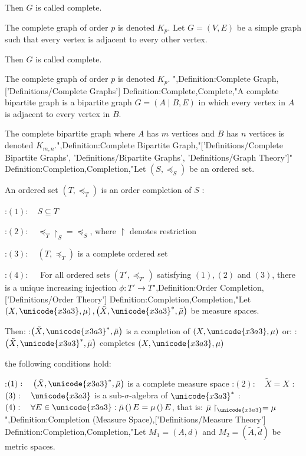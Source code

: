 Then $G$ is called complete.


The complete graph of order $p$ is denoted $K_p$.
Let $G = \left( V, E \right)$ be a simple graph such that every vertex is adjacent to every other vertex.

Then $G$ is called complete.


The complete graph of order $p$ is denoted $K_p$.
",Definition:Complete Graph,['Definitions/Complete Graphs']
Definition:Complete,Complete,"A complete bipartite graph is a bipartite graph $G = \left( A \mid B, E \right)$ in which every vertex in $A$ is adjacent to every vertex in $B$.

The complete bipartite graph where $A$ has $m$ vertices and $B$ has $n$ vertices is denoted $K_{m, n}$.",Definition:Complete Bipartite Graph,"['Definitions/Complete Bipartite Graphs', 'Definitions/Bipartite Graphs', 'Definitions/Graph Theory']"
Definition:Completion,Completion,"Let $\left( S, \preceq_S \right)$ be an ordered set.


An ordered set $\left( T, \preceq_T \right)$ is an order completion of $S$ :

:$(1):\quad S \subseteq T$

:$(2):\quad {\preceq_T \restriction_S} = {\preceq_S}$, where $\restriction$ denotes restriction

:$(3):\quad \left( T, \preceq_T \right)$ is a complete ordered set

:$(4):\quad$ For all ordered sets $\left( T', \preceq_{T'}  \right)$ satisfying $(1), (2)$ and $(3)$, there is a unique increasing injection $\phi: T' \to T$",Definition:Order Completion,['Definitions/Order Theory']
Definition:Completion,Completion,"Let $\left( X, \unicode{x3a3}, \mu \right), \left( \tilde X, \unicode{x3a3}^*, \bar \mu \right)$ be measure spaces.

Then:
:$\left( \tilde X, \unicode{x3a3}^*, \bar \mu \right)$ is a completion of $\left( X, \unicode{x3a3}, \mu \right)$
or:
:$\left( \tilde X, \unicode{x3a3}^*, \bar \mu \right)$ completes $\left( X, \unicode{x3a3}, \mu \right)$

 the following conditions hold:

:$(1): \quad \left( \tilde X, \unicode{x3a3}^*, \bar \mu \right)$ is a complete measure space
:$(2): \quad \tilde X = X$
:$(3): \quad \unicode{x3a3}$ is a sub-$\sigma$-algebra of $\unicode{x3a3}^*$
:$(4): \quad \forall E \in \unicode{x3a3}: \bar \mu \left(   \right)E = \mu \left(   \right)E$, that is: $\bar \mu \restriction_\unicode{x3a3} = \mu$",Definition:Completion (Measure Space),['Definitions/Measure Theory']
Definition:Completion,Completion,"Let $M_1 = \left( A, d \right)$ and $M_2 = \left( \tilde A, \tilde d \right)$ be metric spaces.

